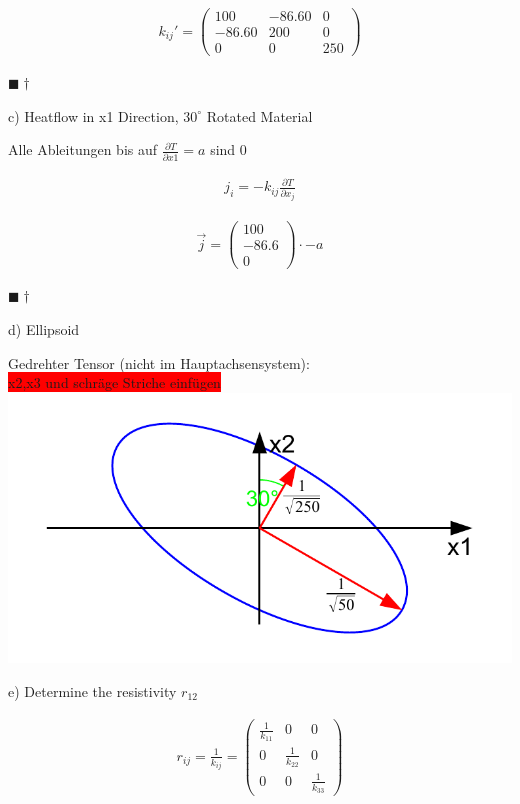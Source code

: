 \documentclass[a4paper]{scrartcl}
\newcommand{\qed}{\begin{flushright}
$\blacksquare \dagger$ \end{flushright}}
\begin{document}
\begin{align}
k_{ij}'=\begin{pmatrix}
100 & -86.60 & 0 \\
-86.60 & 200 & 0 \\
0 & 0 & 250
\end{pmatrix}
\end{align}
\qed

c) Heatflow in x1 Direction, $30^\circ$ Rotated Material

Alle Ableitungen bis auf $\frac{\partial T}{\partial x1}=a$ sind 0


\begin{align}
j_i=-k_{ij} \frac{\partial T}{\partial x_j}
\end{align}

\begin{align}
\vec{j}=\begin{pmatrix}
100 \\
-86.6 \\
0
\end{pmatrix}
\cdot -a
\end{align}

\qed
d) Ellipsoid

\begin{center}
Gedrehter Tensor (nicht im Hauptachsensystem):\\
\colorbox{red}{x2,x3 und schräge Striche einfügen}
\includegraphics[scale=0.8]{images/quadrik_2d_ellipse_uebung_rotation.pdf}
\end{center}

e) Determine the resistivity $r_{12}$

\begin{align}
r_{ij}=\frac{1}{k_{ij}}=\begin{pmatrix}
\frac{1}{k_{11}} & 0 & 0 \\
0 & \frac{1}{k_{22}} & 0 \\
0 & 0 & \frac{1}{k_{33}}
\end{pmatrix}
\end{align}
\end{document}
